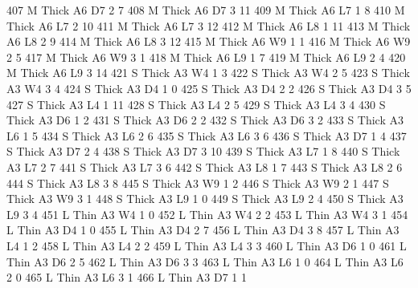 \documentclass{article}
\begin{document}
\begin{Schunk}
\begin{Soutput}
407       M  Thick   A6      D7     2     7
408       M  Thick   A6      D7     3    11
409       M  Thick   A6      L7     1     8
410       M  Thick   A6      L7     2    10
411       M  Thick   A6      L7     3    12
412       M  Thick   A6      L8     1    11
413       M  Thick   A6      L8     2     9
414       M  Thick   A6      L8     3    12
415       M  Thick   A6      W9     1     1
416       M  Thick   A6      W9     2     5
417       M  Thick   A6      W9     3     1
418       M  Thick   A6      L9     1     7
419       M  Thick   A6      L9     2     4
420       M  Thick   A6      L9     3    14
421       S  Thick   A3      W4     1     3
422       S  Thick   A3      W4     2     5
423       S  Thick   A3      W4     3     4
424       S  Thick   A3      D4     1     0
425       S  Thick   A3      D4     2     2
426       S  Thick   A3      D4     3     5
427       S  Thick   A3      L4     1    11
428       S  Thick   A3      L4     2     5
429       S  Thick   A3      L4     3     4
430       S  Thick   A3      D6     1     2
431       S  Thick   A3      D6     2     2
432       S  Thick   A3      D6     3     2
433       S  Thick   A3      L6     1     5
434       S  Thick   A3      L6     2     6
435       S  Thick   A3      L6     3     6
436       S  Thick   A3      D7     1     4
437       S  Thick   A3      D7     2     4
438       S  Thick   A3      D7     3    10
439       S  Thick   A3      L7     1     8
440       S  Thick   A3      L7     2     7
441       S  Thick   A3      L7     3     6
442       S  Thick   A3      L8     1     7
443       S  Thick   A3      L8     2     6
444       S  Thick   A3      L8     3     8
445       S  Thick   A3      W9     1     2
446       S  Thick   A3      W9     2     1
447       S  Thick   A3      W9     3     1
448       S  Thick   A3      L9     1     0
449       S  Thick   A3      L9     2     4
450       S  Thick   A3      L9     3     4
451       L   Thin   A3      W4     1     0
452       L   Thin   A3      W4     2     2
453       L   Thin   A3      W4     3     1
454       L   Thin   A3      D4     1     0
455       L   Thin   A3      D4     2     7
456       L   Thin   A3      D4     3     8
457       L   Thin   A3      L4     1     2
458       L   Thin   A3      L4     2     2
459       L   Thin   A3      L4     3     3
460       L   Thin   A3      D6     1     0
461       L   Thin   A3      D6     2     5
462       L   Thin   A3      D6     3     3
463       L   Thin   A3      L6     1     0
464       L   Thin   A3      L6     2     0
465       L   Thin   A3      L6     3     1
466       L   Thin   A3      D7     1     1

\end{Soutput}
\end{Schunk}
\end{document}

